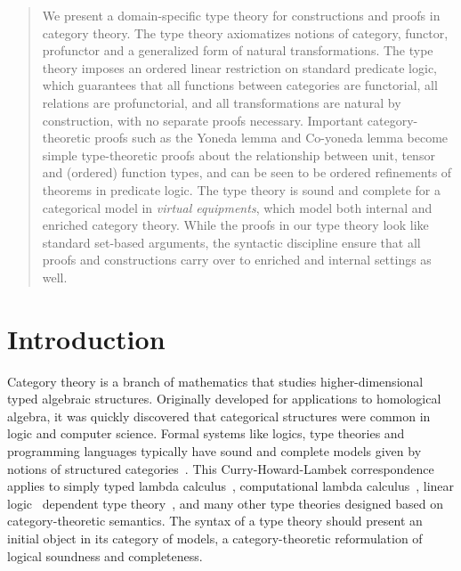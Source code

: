 \documentclass{llncs}
\begin{document}
\begin{abstract}
  We present a domain-specific type theory for constructions and proofs
  in category theory. The type theory axiomatizes notions of category,
  functor, profunctor and a generalized form of natural
  transformations. The type theory imposes an ordered linear restriction
  on standard predicate logic, which guarantees that all functions
  between categories are functorial, all relations are profunctorial,
  and all transformations are natural by construction, with no separate
  proofs necessary. Important category-theoretic proofs such as the
  Yoneda lemma and Co-yoneda lemma become simple type-theoretic proofs
  about the relationship between unit, tensor and (ordered) function
  types, and can be seen to be ordered refinements of theorems in
  predicate logic.  The type theory is sound and complete for a
  categorical model in \emph{virtual equipments}, which model both
  internal and enriched category theory. While the proofs in our type
  theory look like standard set-based arguments, the syntactic
  discipline ensure that all proofs and constructions carry over to
  enriched and internal settings as well.
\end{abstract}

\section{Introduction}

Category theory is a branch of mathematics that studies
higher-dimensional typed algebraic structures.
%
Originally developed for applications to homological algebra, it was
quickly discovered that categorical structures were common in logic and
computer science.  Formal systems like logics, type theories and
programming languages typically have sound and complete models given by
notions of structured categories~\cite{Lawvere69,LambekScott,moggi}.
%
This Curry-Howard-Lambek correspondence~
applies to simply typed lambda calculus~\cite{LambekScott},
computational lambda calculus~\cite{moggi}, linear logic~\cite{girard}
dependent type theory~\cite{cartmell1986,seely_1984}, and many other type theories
designed based on category-theoretic semantics.
%
The syntax of a type theory should present an initial object in its
category of models, a category-theoretic reformulation of logical
soundness and completeness.
\end{document}
